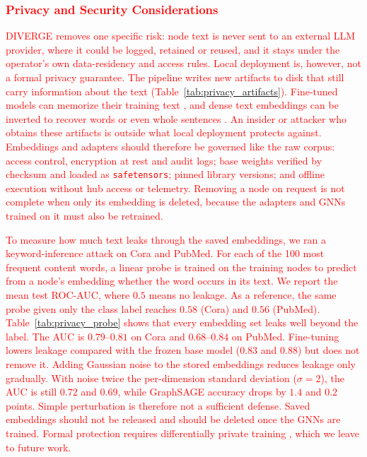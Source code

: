 \documentclass[a4paper,fleqn]{cas-sc}
\newcommand{\revone}[1]{\textcolor{red}{#1}}   %
\begin{document}
\subsubsection{\revone{Privacy and Security Considerations}}\label{sec:privacy}

\revone{DIVERGE removes one specific risk: node text is never sent to an external LLM provider, where it could be logged, retained or reused, and it stays under the operator's own data-residency and access rules. Local deployment is, however, not a formal privacy guarantee. The pipeline writes new artifacts to disk that still carry information about the text (Table~\ref{tab:privacy_artifacts}). Fine-tuned models can memorize their training text \citep{carlini2021extracting}, and dense text embeddings can be inverted to recover words or even whole sentences \citep{song2020information, morris2023text}. An insider or attacker who obtains these artifacts is outside what local deployment protects against. Embeddings and adapters should therefore be governed like the raw corpus: access control, encryption at rest and audit logs; base weights verified by checksum and loaded as \texttt{safetensors}; pinned library versions; and offline execution without hub access or telemetry. Removing a node on request is not complete when only its embedding is deleted, because the adapters and GNNs trained on it must also be retrained.}

\revone{To measure how much text leaks through the saved embeddings, we ran a keyword-inference attack on Cora and PubMed. For each of the 100 most frequent content words, a linear probe is trained on the training nodes to predict from a node's embedding whether the word occurs in its text. We report the mean test ROC-AUC, where $0.5$ means no leakage. As a reference, the same probe given only the class label reaches $0.58$ (Cora) and $0.56$ (PubMed). Table~\ref{tab:privacy_probe} shows that every embedding set leaks well beyond the label. The AUC is $0.79$--$0.81$ on Cora and $0.68$--$0.84$ on PubMed. Fine-tuning lowers leakage compared with the frozen base model ($0.83$ and $0.88$) but does not remove it. Adding Gaussian noise to the stored embeddings reduces leakage only gradually. With noise twice the per-dimension standard deviation ($\sigma=2$), the AUC is still $0.72$ and $0.69$, while GraphSAGE accuracy drops by $1.4$ and $0.2$ points. Simple perturbation is therefore not a sufficient defense. Saved embeddings should not be released and should be deleted once the GNNs are trained. Formal protection requires differentially private training \citep{abadi2016deep}, which we leave to future work.}
\end{document}
